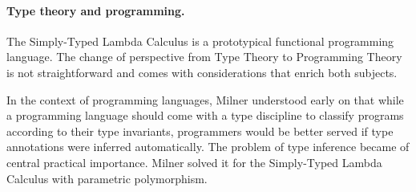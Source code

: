 \documentclass[11pt,twocolumn]{article}
\newcommand{\lcalculus}{\mbox{$\lambda$-calculus}}
\begin{document}

\paragraph{Type theory and programming.}

The Simply-Typed Lambda Calculus 
is a prototypical functional programming language.  The change of
perspective from Type Theory to Programming Theory is not straightforward
and comes with considerations that enrich both subjects.  

In the context of programming languages, Milner %
understood early on that while a programming language should come with a
type discipline to classify programs according to their type invariants,
programmers would be better served if type annotations were inferred
automatically.  
%
The problem of type inference 
became of central practical importance.  
Milner %
solved it %
for the Simply-Typed Lambda Calculus with parametric polymorphism.  
 
\end{document}

